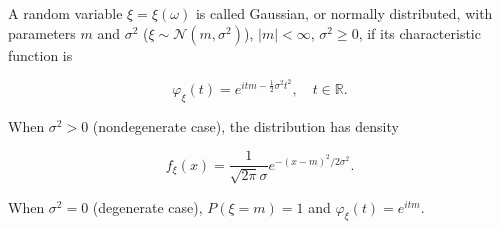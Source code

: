 A random variable $\xi = \xi(\omega)$ is called Gaussian, or normally distributed, with parameters $m$ and $\sigma^2$ ($\xi \sim \mathcal{N}(m, \sigma^2)$), $|m| < \infty$, $\sigma^2 \geq 0$, if its characteristic function is

$$\varphi_\xi(t) = e^{itm - \frac{1}{2}\sigma^2 t^2}, \quad t \in \mathbb{R}.$$

When $\sigma^2 > 0$ (nondegenerate case), the distribution has density

$$f_\xi(x) = \frac{1}{\sqrt{2\pi}\sigma} e^{-(x-m)^2/2\sigma^2}.$$

When $\sigma^2 = 0$ (degenerate case), $P(\xi = m) = 1$ and $\varphi_\xi(t) = e^{itm}$.
